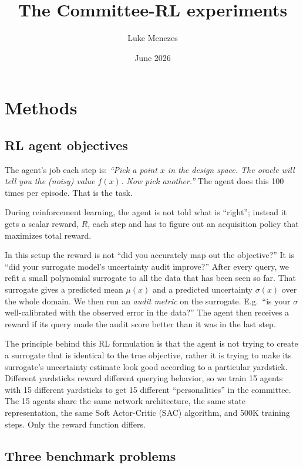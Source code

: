 \documentclass[11pt]{article}
\title{The Committee-RL experiments}
\author{Luke Menezes}
\date{June 2026}
\begin{document}
\maketitle

\section{Methods}

\subsection{RL agent objectives}

The agent's job each step is: \emph{``Pick a point $x$ in the design space. The oracle will tell you the (noisy) value $f(x)$. Now pick another.''} The agent does this 100 times per episode. That is the task.

During reinforcement learning, the agent is not told what is ``right''; instead it gets a scalar reward, $R$, each step and has to figure out an acquisition policy that maximizes total reward.

In this setup the reward is not ``did you accurately map out the objective?'' It is ``did your surrogate model's uncertainty audit improve?'' After every query, we refit a small polynomial surrogate to all the data that has been seen so far. That surrogate gives a predicted mean $\mu(x)$ and a predicted uncertainty $\sigma(x)$ over the whole domain. We then run an \emph{audit metric} on the surrogate. E.g.\ ``is your $\sigma$ well-calibrated with the observed error in the data?'' The agent then receives a reward if its query made the audit score better than it was in the last step.

The principle behind this RL formulation is that the agent is not trying to create a surrogate that is identical to the true objective, rather it is trying to make its surrogate's uncertainty estimate look good according to a particular yardstick. Different yardsticks reward different querying behavior, so we train 15 agents with 15 different yardsticks to get 15 different ``personalities'' in the committee. The 15 agents share the same network architecture, the same state representation, the same Soft Actor-Critic (SAC) algorithm, and 500K training steps. Only the reward function differs.

\subsection{Three benchmark problems}
\end{document}
